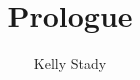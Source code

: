 \documentclass{ximera}[font=12pt]
\title{Prologue}   %
\author{Kelly Stady}
\begin{document}
\begin{abstract}

\end{abstract}

\maketitle
\label{xim:prologue}
\end{document}
